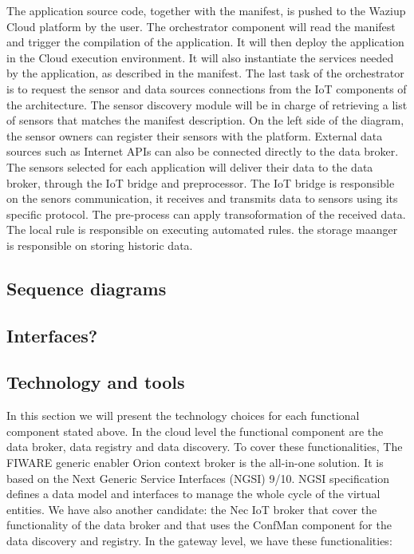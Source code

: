 The application source code, together with the manifest, is pushed to the Waziup Cloud platform by the user. 
The orchestrator component will read the manifest and trigger the compilation of the application. 
It will then deploy the application in the Cloud execution environment. 
It will also instantiate the services needed by the application, as described in the manifest. 
The last task of the orchestrator is to request the sensor and data sources connections from the IoT components of the architecture. 
The sensor discovery module will be in charge of retrieving a list of sensors that matches the manifest description.
On the left side of the diagram, the sensor owners can register their sensors with the platform. External data sources such as Internet APIs can also be connected directly to the data broker. 
The sensors selected for each application will deliver their data to the data broker, through the IoT bridge and preprocessor. The IoT bridge is responsible on the senors communication, it receives and transmits data to sensors using its specific protocol. The pre-process can apply transoformation of the received data. The local rule is responsible on executing automated rules. the storage maanger is responsible on storing historic data.

\subsection{Sequence diagrams}
\subsection{Interfaces?}
\subsection{Technology and tools}

In this section we will present the technology choices for each functional component stated above.
In the cloud level the functional component are the data broker, data registry and data discovery.
To cover these functionalities, The FIWARE generic enabler Orion context broker is the all-in-one solution.
It is based on the Next Generic Service Interfaces (NGSI) 9/10.
NGSI specification defines a data model and interfaces to manage the whole cycle of the virtual entities.  
We have also another candidate: the Nec IoT broker that cover the functionality of the data broker and that uses the ConfMan component for the data discovery and registry.
In the gateway level, we have these functionalities:

